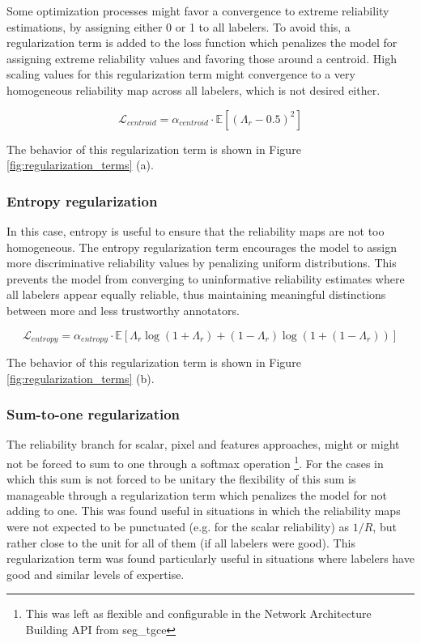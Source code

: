Some optimization processes might favor a convergence to extreme reliability
estimations, by assigning either 0 or 1 to all labelers. To avoid this, a
regularization term is added to the loss function which penalizes the model
for assigning extreme reliability values and favoring those around a
centroid. High scaling values for this regularization term might
convergence to a very homogeneous reliability map across all
labelers, which is not desired either.

\begin{equation}
  \mathcal{L}_{centroid} = \alpha_{centroid} \cdot
  \mathbb{E}[(\Lambda_r - 0.5)^2]
\end{equation}

The behavior of this regularization term is shown in Figure
\ref{fig:regularization_terms} (a).

\subsubsection{Entropy regularization}
In this case, entropy is useful to ensure that the reliability maps
are not too homogeneous. The entropy regularization term encourages
the model to assign more discriminative reliability values by penalizing
uniform distributions. This prevents the model from converging to
uninformative reliability estimates where all labelers appear equally
reliable, thus maintaining meaningful distinctions between more and
less trustworthy annotators.

\begin{equation}
  \mathcal{L}_{entropy} = \alpha_{entropy} \cdot \mathbb{E}[\Lambda_r
    \log(1 + \Lambda_r)
  +(1 - \Lambda_r) \log(1 + (1 - \Lambda_r))]
\end{equation}

The behavior of this regularization term is shown in Figure
\ref{fig:regularization_terms} (b).

\subsubsection{Sum-to-one regularization}

The reliability branch for scalar, pixel and features approaches,
might or might not
be forced to sum to one through a softmax operation \footnote{This
  was left as flexible and configurable in the Network Architecture
Building API from seg\_tgce}. For the cases in which this sum is not
forced to be unitary the flexibility of this sum is manageable
through a regularization term which penalizes the model for not
adding to one. This was found useful in situations in which the
reliability maps were not expected to be punctuated (e.g. for the
scalar reliability) as $1/R$, but rather close to the unit for all of
them (if all labelers were good). This regularization term was found
particularly useful in situations where labelers have good and
similar levels of expertise.

